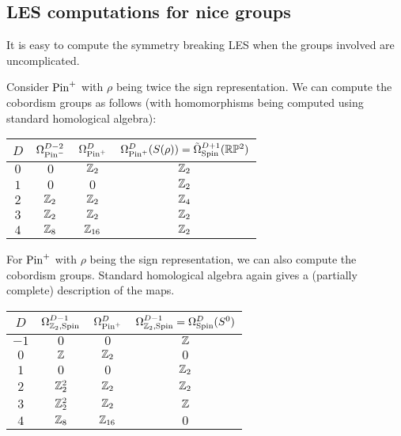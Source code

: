 \subsection{LES computations for nice groups}

It is easy to compute the symmetry breaking LES when the groups involved are uncomplicated.

\begin{ex}
	Consider $\mathrm{Pin}^+$ with $\rho$ being twice the sign representation.
	We can compute the cobordism groups as follows (with homomorphisms being computed using standard homological algebra):

	\begin{center}
		\begin{tabular}{|c|c|c|c|} \hline
			$D$ & $\Omega^{D-2}_{\mathrm{Pin}^-}$ & $\Omega^D_{\mathrm{Pin}^+}$ & $\Omega^D_{\mathrm{Pin}^+}(S(\rho)) = \tilde{\Omega}^{D+1}_{\mathrm{Spin}}(\mathbb{R}\mathbb{P}^2)$ \\ \hline
			$0$ & $0$ & $\mathbb{Z}_2$ & $\mathbb{Z}_2$ \\ \hline
			$1$ & $0$ & $0$ & $\mathbb{Z}_2$ \\ \hline
			$2$ & $\mathbb{Z}_2$ & $\mathbb{Z}_2$ & $\mathbb{Z}_4$ \\ \hline
			$3$ & $\mathbb{Z}_2$ & $\mathbb{Z}_2$ & $\mathbb{Z}_2$ \\ \hline
			$4$ & $\mathbb{Z}_8$ & $\mathbb{Z}_{16}$ & $\mathbb{Z}_2$ \\ \hline
		\end{tabular}
	\end{center}
\end{ex}

\begin{ex}
	For $\mathrm{Pin}^+$ with $\rho$ being the sign representation, we can also compute the cobordism groups.
	Standard homological algebra again gives a (partially complete) description of the maps.
	
	\begin{center}
		\begin{tabular}{|c|c|c|c|} \hline
			$D$ & $\Omega^{D-1}_{\mathbb{Z}_2,\mathrm{Spin}}$ & $\Omega^D_{\mathrm{Pin}^+}$ & $ \Omega^{D-1}_{\mathbb{Z}_2,\mathrm{Spin}} = \Omega^D_{\mathrm{Spin}}(S^0)$ \\ \hline
			$-1$ & $0$ & $0$ & $\mathbb{Z}$ \\ \hline
			$0$ & $\mathbb{Z}$ & $\mathbb{Z}_2$ & $0$ \\ \hline
			$1$ & $0$ & $0$ & $\mathbb{Z}_2$ \\ \hline
			$2$ & $\mathbb{Z}_2^2$ & $\mathbb{Z}_2$ & $\mathbb{Z}_2$ \\ \hline
			$3$ & $\mathbb{Z}_2^2$ & $\mathbb{Z}_2$ & $\mathbb{Z}$ \\ \hline
			$4$ & $\mathbb{Z}_8$ & $\mathbb{Z}_{16}$ & $0$ \\ \hline
		\end{tabular}
	\end{center}
\end{ex}
